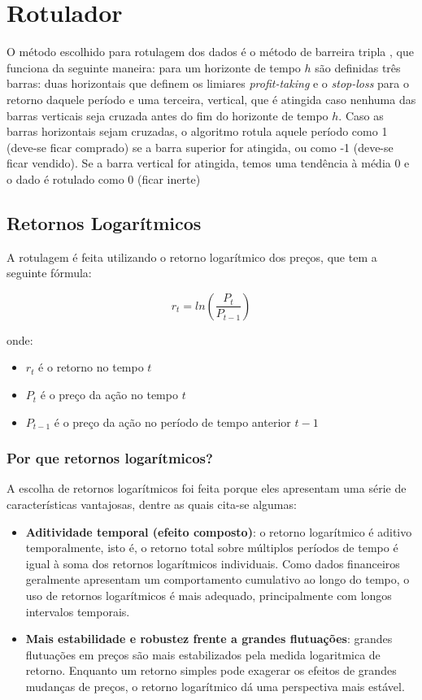 \documentclass{article}
\begin{document}
\section{Rotulador}

O método escolhido para rotulagem dos dados é o método de barreira tripla \cite{Prado}, que funciona da seguinte maneira: para um horizonte de tempo $h$ são definidas três barras: duas horizontais que definem os limiares \textit{profit-taking} e o \textit{stop-loss} para o retorno daquele período e uma terceira, vertical, que é atingida caso nenhuma das barras verticais seja cruzada antes do fim do horizonte de tempo $h$. Caso as barras horizontais sejam cruzadas, o algoritmo rotula aquele período como 1 (deve-se ficar comprado) se a barra superior for atingida, ou como -1 (deve-se ficar vendido). Se a barra vertical for atingida, temos uma tendência à média 0 e o dado é rotulado como 0 (ficar inerte)

\subsection{Retornos Logarítmicos}

A rotulagem é feita utilizando o retorno logarítmico dos preços, que tem a seguinte fórmula:

$$ r_t = ln \left( \frac{P_t}{P_{t - 1}} \right) $$

onde:
\begin{itemize}
    \item $r_t$ é o retorno no tempo $t$
    \item ${P_t}$ é o preço da ação no tempo $t$
    \item $P_{t - 1}$ é o preço da ação no período de tempo anterior $t - 1$
\end{itemize}

\subsubsection{Por que retornos logarítmicos?}

A escolha de retornos logarítmicos foi feita porque eles apresentam uma série de características vantajosas, dentre as quais cita-se algumas:

\begin{itemize}
    \item \textbf{Aditividade temporal (efeito composto)}: o retorno logarítmico é aditivo temporalmente, isto é, o retorno total sobre múltiplos períodos de tempo é igual à soma dos retornos logarítmicos individuais. Como dados financeiros geralmente apresentam um comportamento cumulativo ao longo do tempo, o uso de retornos logarítmicos é mais adequado, principalmente com longos intervalos temporais. \cite{Hull}
    \item \textbf{Mais estabilidade e robustez frente a grandes flutuações}: grandes flutuações em preços são mais estabilizados pela medida logaritmica de retorno. Enquanto um retorno simples pode exagerar os efeitos de grandes mudanças de preços, o retorno logarítmico dá uma perspectiva mais estável. \cite{Bouchaud}
\end{itemize}
\end{document}
